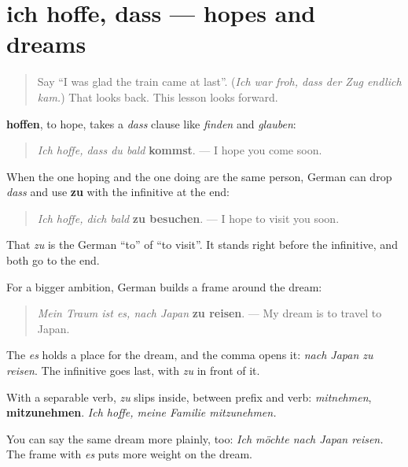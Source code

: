 \section[ich hoffe, dass …; mein Traum ist es …]{ich hoffe, dass — hopes and dreams}

\label{lesson:GE-C258-ich-hoffe-dass}



\begin{quote}
Say \textquotedblleft{}I was glad the train came at last\textquotedblright{}. (\emph{Ich war froh, dass der Zug endlich kam.}) That looks back. This lesson looks forward.
\end{quote}

\begin{grammarlens}[title={Grammar Lens: ich hoffe, two ways}]
\textbf{hoffen}, to hope, takes a \emph{dass} clause like \emph{finden} and \emph{glauben}:

\begin{quote}
\emph{Ich hoffe, dass du bald} \textbf{kommst}. — I hope you come soon.
\end{quote}

When the one hoping and the one doing are the same person, German can drop \emph{dass} and use \textbf{zu} with the infinitive at the end:

\begin{quote}
\emph{Ich hoffe, dich bald} \textbf{zu besuchen}. — I hope to visit you soon.
\end{quote}

That \emph{zu} is the German \textquotedblleft{}to\textquotedblright{} of \textquotedblleft{}to visit\textquotedblright{}. It stands right before the infinitive, and both go to the end.
\end{grammarlens}

\begin{culture}
For a bigger ambition, German builds a frame around the dream:

\begin{quote}
\emph{Mein Traum ist es, nach Japan} \textbf{zu reisen}. — My dream is to travel to Japan.
\end{quote}

The \emph{es} holds a place for the dream, and the comma opens it: \emph{nach Japan zu reisen}. The infinitive goes last, with \emph{zu} in front of it.

With a separable verb, \emph{zu} slips inside, between prefix and verb: \emph{mitnehmen}, \textbf{mitzunehmen}. \emph{Ich hoffe, meine Familie mitzunehmen.}

You can say the same dream more plainly, too: \emph{Ich möchte nach Japan reisen.} The frame with \emph{es} puts more weight on the dream.
\end{culture}

